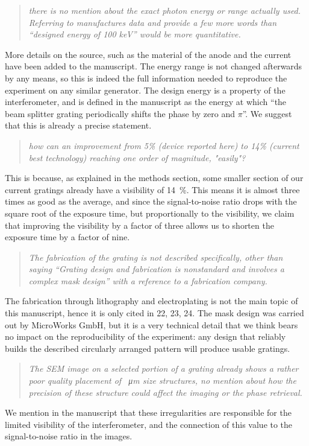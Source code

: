 \documentclass[a4paper,english]{scrartcl}
\newenvironment{reviewerquote}{\begin{quote}\itshape}{\end{quote}}
\begin{document}
\begin{reviewerquote}
there is no mention about the exact photon energy or range actually used.
Referring to manufactures data and provide a few more words than ``designed
energy of 100 keV'' would be more quantitative.
\end{reviewerquote}

More details on the source, such as the material of the anode and the
current have been added to the manuscript. The energy range is not changed
afterwards by any means, so this is indeed the full
information needed to reproduce the experiment on any similar generator.
The design energy is a property of the interferometer, and is defined in the
manuscript as the energy at which ``the beam splitter grating periodically
shifts the phase by zero and $\pi$''. We suggest that this is already a
precise statement.

\begin{reviewerquote}
    how can an improvement from 5\% (device reported here) to 14\% (current best technology) reaching one order of magnitude, "easily"?
\end{reviewerquote}

This is because, as explained in the methods section, some smaller section
of our current gratings already have a visibility of \SI{14}{\percent}. This
means it is almost three times as good as the average, and since the
signal-to-noise ratio drops with the square root of the exposure time, but
proportionally to the visibility, we claim that improving the visibility by
a factor of three allows us to shorten the exposure time by a factor of
nine.

\begin{reviewerquote}
    The fabrication of the grating is not described specifically, other than
    saying ``Grating design and fabrication is nonstandard and involves a
    complex mask design'' with a reference to a fabrication company.
\end{reviewerquote}

The fabrication through lithography and electroplating is not the main topic
of this manuscript, hence it is only cited in 22, 23, 24. The mask design
was carried out by MicroWorks GmbH, but it is a very technical detail that
we think bears no impact on the reproducibility of the experiment: any
design that reliably builds the described circularly arranged pattern will
produce usable gratings.

\begin{reviewerquote}
    The SEM image on a selected portion of a grating already shows a rather
    poor quality placement of \SI{}{\micro\meter} size structures, no mention about
    how the precision of these structure could affect the imaging or the
    phase retrieval.
\end{reviewerquote}

We mention in the manuscript that these irregularities are responsible for the limited
visibility of the interferometer, and the connection of this value to the signal-to-noise
ratio in the images.



\end{document}
